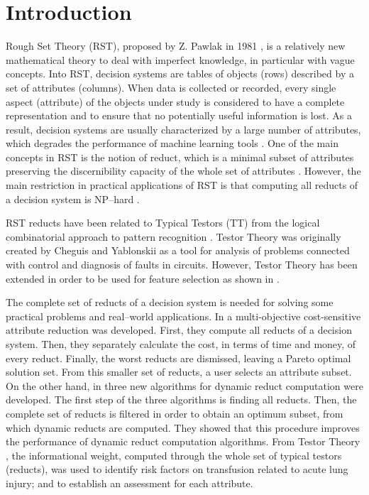 \documentclass[authoryear,preprint,review,12pt]{elsarticle}
\begin{document}
\section{Introduction}
  Rough Set Theory (RST), proposed by Z. Pawlak in 1981 \citep{Pawlak81,Pawlak81-2,Pawlak82,Pawlak91}, 
  is a relatively new mathematical theory to deal with imperfect knowledge, in particular with vague 
  concepts. Into RST, decision systems are tables of objects (rows) described by a set of attributes (columns). 
  When data is collected or recorded, every single aspect (attribute) of the objects under study is
  considered to have a complete representation and to ensure that no potentially useful information is lost. As a result, decision systems are usually characterized by a large number of attributes, which degrades the performance of machine learning tools \citep{Parthalain08}. One of the main concepts in RST is the notion of reduct, which is a minimal subset of attributes preserving the discernibility capacity of the whole set of attributes \citep{Pawlak91}. However, the main restriction in practical applications of RST is that computing all reducts of a decision system is NP--hard \citep{Skowron92}. 
   
   RST reducts have been related to Typical Testors (TT) from the logical combinatorial approach to pattern recognition \citep{Chikalov2013}. Testor Theory was originally created by Cheguis and Yablonskii \cite{Cheguis55} as a tool for analysis of problems connected with control and diagnosis of faults in circuits.  However, Testor Theory has been extended in order to be used for feature selection as shown in \citep{Dmitriev1966,Martinez01,Ruiz08}.

  The complete set of reducts of a decision system is needed for solving some practical problems and real--world applications. In \cite{Xu2013} a multi-objective cost-sensitive attribute reduction was developed. First, they compute all reducts of a decision system. Then, they separately calculate the cost, in terms of time and money, of every reduct. Finally, the worst reducts are dismissed, leaving a Pareto optimal solution set. From this smaller set of reducts, a user selects an attribute subset. On the other hand, in \cite{Mukamakuza2014} three new algorithms for dynamic reduct computation were developed. The first step of the three algorithms is finding all reducts. Then, the complete set of reducts is filtered in order to obtain an optimum subset, from which dynamic reducts are computed. They showed that this procedure improves the performance of dynamic reduct computation algorithms. From Testor Theory \cite{Torres2014}, the informational weight, computed through the whole set of typical testors (reducts), was used to identify risk factors on transfusion related to acute lung injury; and to establish an assessment for each attribute.  
  
\end{document}
